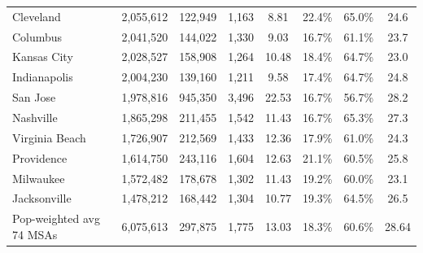\documentclass[letterpaper,12pt,dvipsnames,usenames]{article}
\theoremstyle{definition}
\begin{document}
\begin{spacing}{1.0}
\begin{small}
\begin{table}
\begin{center}
{\begin{tabular}{lccccccc}
    Cleveland &               2,055,612  &          122,949  &          1,163  & 8.81  & 22.4\% & 65.0\% & 24.6\\
    Columbus &               2,041,520  &          144,022  &          1,330  & 9.03  & 16.7\% & 61.1\% & 23.7\\
    Kansas City &               2,028,527  &          158,908  &          1,264  & 10.48 & 18.4\% & 64.7\% & 23.0\\
    Indianapolis &               2,004,230  &          139,160  &          1,211  & 9.58  & 17.4\% & 64.7\% & 24.8\\
    San Jose &               1,978,816  &          945,350  &          3,496  & 22.53 & 16.7\% & 56.7\% & 28.2 \\
    Nashville &               1,865,298  &          211,455  &          1,542  & 11.43 & 16.7\% & 65.3\% & 27.3\\
    Virginia Beach &               1,726,907  &          212,569  &          1,433  & 12.36 & 17.9\% & 61.0\% & 24.3\\
    Providence &               1,614,750  &          243,116  &          1,604  & 12.63 & 21.1\% & 60.5\% & 25.8\\
    Milwaukee &               1,572,482  &          178,678  &          1,302  & 11.43 & 19.2\% & 60.0\% & 23.1\\
    Jacksonville &               1,478,212  &          168,442  &          1,304  & 10.77 & 19.3\% & 64.5\% & 26.5 \\             \hline
    Pop-weighted avg 74 MSAs &  6,075,613 & 297,875 & 1,775 & 13.03 & 18.3\% & 60.6\%  &  28.64  \\
    \hline
    \end{tabular}%
    }
    \end{center}
  \end{table}%




\end{small}
\end{spacing}
\end{document}
